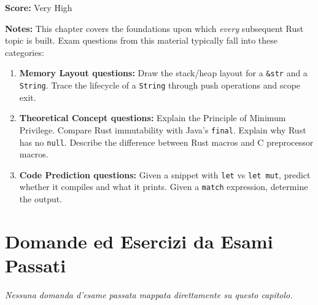 \textbf{Score:} Very High

\textbf{Notes:} This chapter covers the foundations upon which \emph{every} subsequent Rust topic is built. Exam questions from this material typically fall into these categories:

\begin{enumerate}
    \item \textbf{Memory Layout questions:} Draw the stack/heap layout for a \texttt{\&str} and a \texttt{String}. Trace the lifecycle of a \texttt{String} through push operations and scope exit.
    \item \textbf{Theoretical Concept questions:} Explain the Principle of Minimum Privilege. Compare Rust immutability with Java's \texttt{final}. Explain why Rust has no \texttt{null}. Describe the difference between Rust macros and C preprocessor macros.
    \item \textbf{Code Prediction questions:} Given a snippet with \texttt{let} vs \texttt{let mut}, predict whether it compiles and what it prints. Given a \texttt{match} expression, determine the output.
\end{enumerate}

\section{Domande ed Esercizi da Esami Passati}

\textit{Nessuna domanda d'esame passata mappata direttamente su questo capitolo.}
